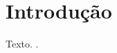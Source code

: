 

\pagestyle{fancy}
\fancyhf{}
\fancyhead[R]{\small\thepage}
\renewcommand{\headrulewidth}{0pt}

\chapter{Introdução} \label{cha:introducao}

Texto. \cite{bannisterthugge01,winters02}.


